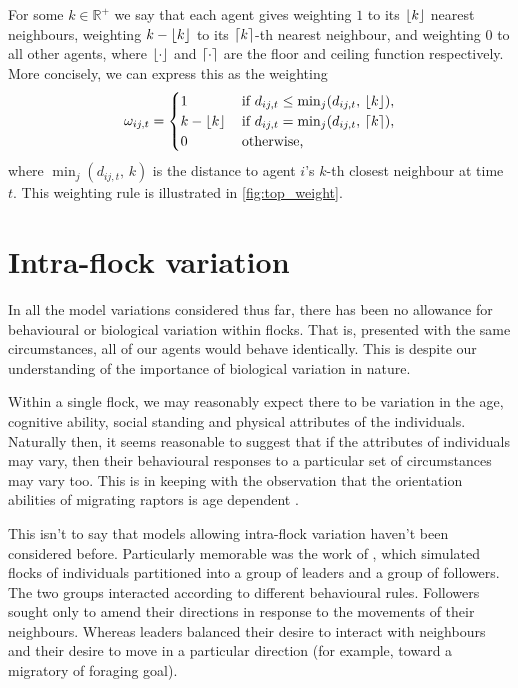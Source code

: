 For some $k\in\mathbb{R}^+$ we say that each agent gives weighting $1$ to its $\lfloor k\rfloor$
nearest neighbours, weighting $k - \lfloor k\rfloor$ to its $\lceil k\rceil$-th nearest neighbour, and
weighting $0$ to all other agents, where $\lfloor\cdot\rfloor$ and $\lceil\cdot\rceil$ are the floor
and ceiling function respectively. More concisely, we can express this as the weighting
\begin{equation}
    \label{eq:top_interaction}
	\omega_{ij,t} =
	\begin{cases}
		1           & \, \text{if } d_{ij, t} \leq \min_j(d_{ij,t},\, \lfloor k\rfloor), \\
		k-\lfloor k\rfloor & \, \text{if } d_{ij, t} = \min_j(d_{ij,t},\, \lceil k\rceil),     \\
		0           & \, \text{otherwise,}
	\end{cases}
\end{equation}
where $\min_j(d_{ij,t},\, k)$ is the distance to agent $i$'s $k$-th closest neighbour at
time $t$. This weighting rule is illustrated in \cref{fig:top_weight}.

\section{Intra-flock variation}

In all the model variations considered thus far, there has been no allowance for
behavioural or biological variation within flocks. That is, presented with the same
circumstances, all of our agents would behave identically. This is despite our
understanding of the importance of biological variation in nature.

Within a single flock, we may reasonably expect there to be variation in the age,
cognitive ability, social standing and physical attributes of the individuals. Naturally
then, it seems reasonable to suggest that if the attributes of individuals may vary, then
their behavioural responses to a particular set of circumstances may vary too.
This is in keeping with the observation that the orientation abilities of migrating
raptors is age dependent \parencite{thorup03}.

This isn't to say that models allowing intra-flock variation haven't been considered
before. Particularly memorable was the work of \textcite{couzin05}, which simulated flocks
of individuals partitioned into a group of leaders and a group of followers. The two groups
interacted according to different behavioural rules. Followers sought only to amend their
directions in response to the movements of their neighbours. Whereas leaders balanced
their desire to interact with neighbours and their desire to move in a particular
direction (for example, toward a migratory of foraging goal).

